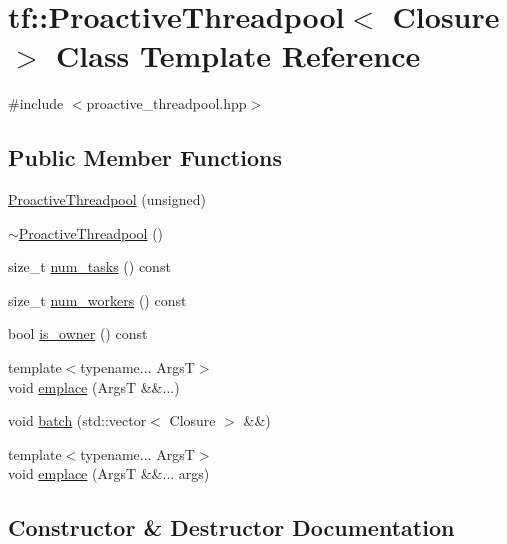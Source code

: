 \hypertarget{classtf_1_1ProactiveThreadpool}{}\section{tf\+:\+:Proactive\+Threadpool$<$ Closure $>$ Class Template Reference}
\label{classtf_1_1ProactiveThreadpool}


{\ttfamily \#include $<$proactive\+\_\+threadpool.\+hpp$>$}

\subsection*{Public Member Functions}
\begin{DoxyCompactItemize}
\item 
\hyperlink{classtf_1_1ProactiveThreadpool_a14064eea0c5ddc8035b383fb56aecde9}{Proactive\+Threadpool} (unsigned)
\item 
\hyperlink{classtf_1_1ProactiveThreadpool_aaf941a6716162ecc7f17978b9b2f459f}{$\sim$\+Proactive\+Threadpool} ()
\item 
size\+\_\+t \hyperlink{classtf_1_1ProactiveThreadpool_a4ffa8ab018d0bb63fbee5ae16035bb15}{num\+\_\+tasks} () const
\item 
size\+\_\+t \hyperlink{classtf_1_1ProactiveThreadpool_addcc49e4a76ced0b0d0a3d7e00796d42}{num\+\_\+workers} () const
\item 
bool \hyperlink{classtf_1_1ProactiveThreadpool_a0b478ad6f2f64f3e22ae747aad2319a9}{is\+\_\+owner} () const
\item 
{\footnotesize template$<$typename... ArgsT$>$ }\\void \hyperlink{classtf_1_1ProactiveThreadpool_a08c817ca88c05b89afb6b14ae7818360}{emplace} (ArgsT \&\&...)
\item 
void \hyperlink{classtf_1_1ProactiveThreadpool_a633c010f7aa8183edfaad08be51f6eff}{batch} (std\+::vector$<$ Closure $>$ \&\&)
\item 
{\footnotesize template$<$typename... ArgsT$>$ }\\void \hyperlink{classtf_1_1ProactiveThreadpool_a153619f1fc86a334f1b425af26c38f75}{emplace} (ArgsT \&\&... args)
\end{DoxyCompactItemize}


\subsection{Constructor \& Destructor Documentation}
\mbox{\label{classtf_1_1ProactiveThreadpool_a14064eea0c5ddc8035b383fb56aecde9}} 
